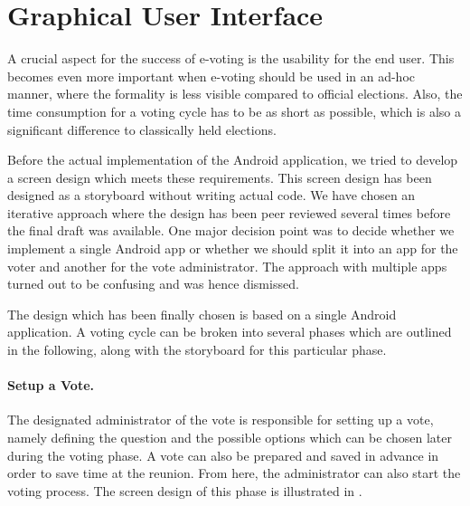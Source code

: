 \documentclass[numbers=noenddot, abstract=on, a4paper, headsepline,
footsepline, oneside, draft=off]{scrreprt}
\begin{document}
\section{Graphical User Interface}
\label{sec:gui}
A crucial aspect for the success of e-voting is the usability for the end user.
This becomes even more important when e-voting should be used in an ad-hoc
manner, where the formality is less visible compared to official elections.
Also, the time consumption for a voting cycle has to be as short as possible,
which is also a significant difference to classically held elections.

Before the actual implementation of the Android application, we tried to develop
a screen design which meets these requirements. This screen design has been
designed as a storyboard without writing actual code. We have chosen an
iterative approach where the design has been peer reviewed several times before
the final draft was available. One major decision point was to decide whether we
implement a single Android app or whether we should split it into an app for the
voter and another for the vote administrator. The approach with multiple apps
turned out to be confusing and was hence dismissed.

The design which has been finally chosen is based on a single Android
application. A voting cycle can be broken into several phases which are outlined
in the following, along with the storyboard for this particular phase.

\paragraph{Setup a Vote.}
The designated administrator of the vote is responsible for setting up a vote,
namely defining the question and the possible options which can be chosen later
during the voting phase. A vote can also be prepared and saved in advance in
order to save time at the reunion. From here, the administrator can also
start the voting process. The screen design of this phase is illustrated in
.
\end{document}
